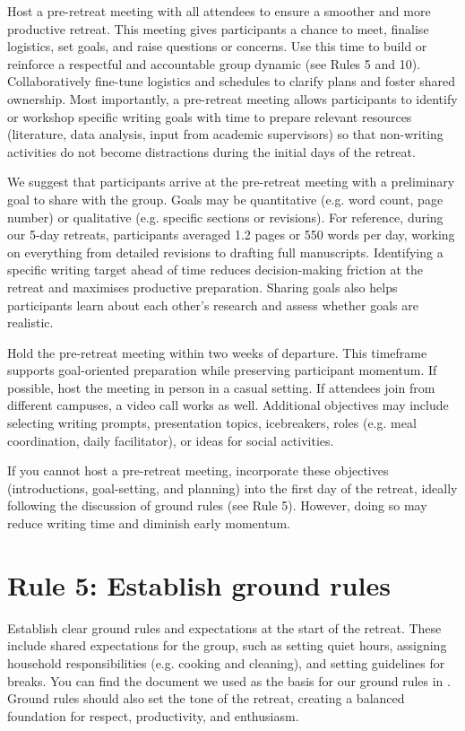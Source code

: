 \documentclass[10pt,letterpaper]{article}
\begin{document}
Host a pre-retreat meeting with all attendees to ensure a smoother and more productive retreat. This meeting gives participants a chance to meet, finalise logistics, set goals, and raise questions or concerns. Use this time to build or reinforce a respectful and accountable group dynamic (see Rules 5 and 10). Collaboratively fine-tune logistics and schedules to clarify plans and foster shared ownership. Most importantly, a pre-retreat meeting allows participants to identify or workshop specific writing goals with time to prepare relevant resources (literature, data analysis, input from academic supervisors) so that non-writing activities do not become distractions during the initial days of the retreat.

We suggest that participants arrive at the pre-retreat meeting with a preliminary goal to share with the group. Goals may be quantitative (e.g. word count, page number) or qualitative (e.g. specific sections or revisions). For reference, during our 5-day retreats, participants averaged 1.2 pages or 550 words per day, working on everything from detailed revisions to drafting full manuscripts. Identifying a specific writing target ahead of time reduces decision-making friction at the retreat and maximises productive preparation. Sharing goals also helps participants learn about each other's research and assess whether goals are realistic.

Hold the pre-retreat meeting within two weeks of departure. This timeframe supports goal-oriented preparation while preserving participant momentum. If possible, host the meeting in person in a casual setting. If attendees join from different campuses, a video call works as well. Additional objectives may include selecting writing prompts, presentation topics, icebreakers, roles (e.g. meal coordination, daily facilitator), or ideas for social activities.

If you cannot host a pre-retreat meeting, incorporate these objectives (introductions, goal-setting, and planning) into the first day of the retreat, ideally following the discussion of ground rules (see Rule 5). However, doing so may reduce writing time and diminish early momentum.

\section*{Rule 5: Establish ground rules}

Establish clear ground rules and expectations at the start of the retreat. These include shared expectations for the group, such as setting quiet hours, assigning household responsibilities (e.g. cooking and cleaning), and setting guidelines for breaks. You can find the document we used as the basis for our ground rules in . Ground rules should also set the tone of the retreat, creating a balanced foundation for respect, productivity, and enthusiasm.
\end{document}

